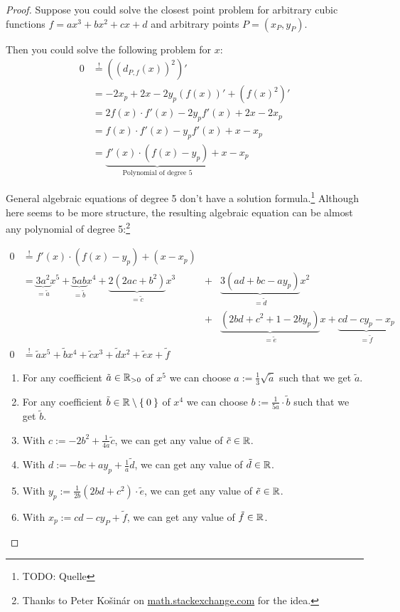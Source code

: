 \begin{proof}
    Suppose you could solve the closest point problem for arbitrary
    cubic functions $f = ax^3 + bx^2 + cx + d$ and arbitrary points $P = (x_P, y_P)$.

    Then you could solve the following problem for $x$:
    \begin{align}
        0  &\stackrel{!}{=} \left ((d_{P,f}(x))^2 \right )'\\
           &=-2 x_p + 2x -2y_p(f(x))' + (f(x)^2)'\\
           &= 2 f(x) \cdot f'(x) - 2 y_p f'(x) + 2x - 2 x_p\\
           &= f(x) \cdot f'(x) - y_p f'(x) + x - x_p\\
           &= \underbrace{f'(x) \cdot \left (f(x) - y_p \right )}_{\text{Polynomial of degree 5}} + x - x_p
    \end{align}

    General algebraic equations of degree 5 don't have a solution formula.\footnote{TODO: Quelle}
    Although here seems to be more structure, the resulting algebraic
    equation can be almost any polynomial of degree 5:\footnote{Thanks to Peter Košinár on \href{http://math.stackexchange.com/a/584814/6876}{math.stackexchange.com} for the idea.}

    \begin{align}
        0  &\stackrel{!}{=} f'(x) \cdot \left (f(x) - y_p \right ) + (x - x_p)\\
        &= \underbrace{3 a^2}_{= \tilde{a}} x^5 + \underbrace{5ab}_{= \tilde{b}}x^4 + \underbrace{2(2ac + b^2 )}_{= \tilde{c}}x^3 &+& \underbrace{3(ad+bc-ay_p)}_{= \tilde{d}} x^2 \\
        & &+& \underbrace{(2 b d+c^2+1-2 b y_p)}_{= \tilde{e}}x+\underbrace{c d-c y_p-x_p}_{= \tilde{f}}\\
        0 &\stackrel{!}{=} \tilde{a}x^5 + \tilde{b}x^4 + \tilde{c}x^3 + \tilde{d}x^2 + \tilde{e}x + \tilde{f}
    \end{align}

    \begin{enumerate}
        \item For any coefficient $\tilde{a} \in \mathbb{R}_{> 0}$ of $x^5$ we can choose $a := \frac{1}{3} \sqrt{\tilde{a}}$ such that we get $\tilde{a}$.
        \item For any coefficient $\tilde{b} \in \mathbb{R} \setminus \Set{0}$ of $x^4$ we can choose $b := \frac{1}{5a} \cdot \tilde{b}$ such that we get $\tilde{b}$.
        \item With $c := -2b^2 + \frac{1}{4a} \tilde{c}$, we can get any value of $\tilde{c} \in \mathbb{R}$.
        \item With $d := -bc + a y_p + \frac{1}{a} \tilde{d}$, we can get any value of $\tilde{d} \in \mathbb{R}$.
        \item With $y_p := \frac{1}{2b}(2bd + c^2)\cdot \tilde{e}$, we can get any value of $\tilde{e} \in \mathbb{R}$.
        \item With $x_p := cd - c y_P+\tilde{f}$, we can get any value of $\tilde{f} \in \mathbb{R}$.
    \end{enumerate}


\end{proof}
